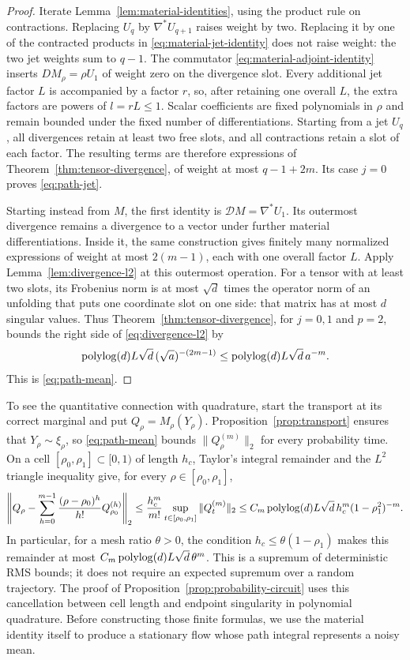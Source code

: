 \begin{proof}
Iterate Lemma~\ref{lem:material-identities}, using the product rule
on contractions.  Replacing $U_q$ by $\nabla^*U_{q+1}$ raises weight
by two.  Replacing it by one of the contracted products in
\eqref{eq:material-jet-identity} does not raise weight: the two jet
weights sum to $q-1$.  The commutator
\eqref{eq:material-adjoint-identity} inserts $DM_\rho=\rho U_1$
of weight zero on the divergence slot.  Every additional jet factor
$L$ is accompanied by a factor $r$, so, after retaining one overall
$L$, the extra factors are powers of $l=rL\le1$.  Scalar
coefficients are fixed polynomials in $\rho$ and remain bounded
under the fixed number of differentiations.  Starting from a jet
$U_q$, all divergences retain at least two free slots, and all
contractions retain a slot of each factor.  The resulting terms are
therefore expressions of Theorem~\ref{thm:tensor-divergence}, of weight
at most $q-1+2m$.  Its case $j=0$ proves \eqref{eq:path-jet}.

Starting instead from $M$, the first identity is
$\mathcal DM=\nabla^*U_1$.  Its outermost divergence remains a
divergence to a vector under further material differentiations.
Inside it, the same construction gives finitely many normalized
expressions of weight at most $2(m-1)$, each with one overall factor
$L$.  Apply Lemma~\ref{lem:divergence-l2} at this outermost operation.
For a tensor with at least two slots, its Frobenius norm is at most
$\sqrt d$ times the operator norm of an unfolding that puts one
coordinate slot on one side: that matrix has at most $d$ singular
values.  Thus Theorem~\ref{thm:tensor-divergence}, for $j=0,1$ and
$p=2$, bounds the right side of \eqref{eq:divergence-l2} by
\[
 \operatorname{polylog}(d)L\sqrt d\,(\sqrt a)^{-(2m-1)}
 \le\operatorname{polylog}(d)L\sqrt d\,a^{-m}.
\]
This is \eqref{eq:path-mean}.
\end{proof}

To see the quantitative connection with quadrature, start the transport
at its correct marginal and put $Q_\rho=M_\rho(Y_\rho)$.
Proposition~\ref{prop:transport} ensures that $Y_\rho\sim\xi_\rho$,
so \eqref{eq:path-mean} bounds $\|Q_\rho^{(m)}\|_2$ for every
probability time.  On a cell $[\rho_0,\rho_1]\subset[0,1)$ of length
$h_c$, Taylor's integral remainder and the $L^2$ triangle inequality give,
for every $\rho\in[\rho_0,\rho_1]$,
\[
 \left\|Q_\rho-
       \sum_{h=0}^{m-1}\frac{(\rho-\rho_0)^h}{h!}Q_{\rho_0}^{(h)}\right\|_2
 \le \frac{h_c^m}{m!}\sup_{t\in[\rho_0,\rho_1]}\|Q_t^{(m)}\|_2
 \le C_m\operatorname{polylog}(d)L\sqrt d\,
             h_c^m(1-\rho_1^2)^{-m}.
\]
In particular, for a mesh ratio $\theta>0$, the condition
$h_c\le\theta(1-\rho_1)$ makes this remainder at most
$C_m\operatorname{polylog}(d)L\sqrt d\,\theta^m$.
This is a supremum of deterministic RMS bounds; it does not require
an expected supremum over a random trajectory.  The proof of
Proposition~\ref{prop:probability-circuit} uses this cancellation
between cell length and endpoint singularity in polynomial quadrature.
Before constructing those finite formulas, we use the material identity
itself to produce a stationary flow whose path integral represents a
noisy mean.
